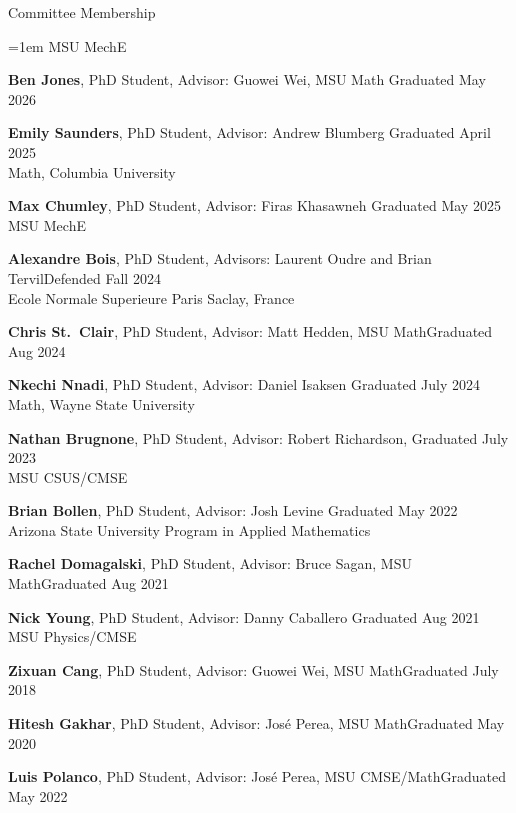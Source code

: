 \documentclass{resume} %
\begin{document}
\begin{rSection}{Committee Membership}
\begin{list}{}{\leftmargin=1em}
   \phantom{xxx}MSU MechE
   \item \textbf{Ben Jones}, PhD Student, Advisor: Guowei Wei, MSU Math \hfill Graduated May 2026
   \item \textbf{Emily Saunders}, PhD Student, Advisor: Andrew Blumberg \hfill Graduated April 2025\\
   \phantom{xxx}Math, Columbia University   
   \item \textbf{Max Chumley}, PhD Student, Advisor: Firas Khasawneh \hfill  Graduated May 2025\\
   \phantom{xxx}MSU MechE
   \item \textbf{Alexandre Bois}, PhD Student, Advisors: Laurent Oudre and Brian Tervil\hfill{Defended Fall 2024}\\
   \phantom{xxx}Ecole Normale Superieure Paris Saclay, France
   \item \textbf{Chris St.~Clair}, PhD Student, Advisor: Matt Hedden, MSU Math\hfill Graduated Aug 2024
   \item \textbf{Nkechi Nnadi}, PhD Student, Advisor: Daniel Isaksen \hfill Graduated July 2024\\
   \phantom{xxx}Math, Wayne State University 
   \item \textbf{Nathan Brugnone}, PhD Student, Advisor: Robert Richardson, \hfill  Graduated July 2023\\
   \phantom{xxx}MSU CSUS/CMSE 
    \item \textbf{Brian Bollen}, PhD Student, Advisor: Josh Levine \hfill Graduated May 2022\\
    \phantom{xxx}Arizona State University Program in Applied Mathematics
   \item \textbf{Rachel Domagalski}, PhD Student, Advisor: Bruce Sagan, MSU Math\hfill Graduated Aug 2021
   \item \textbf{Nick Young}, PhD Student, Advisor: Danny Caballero \hfill Graduated Aug 2021\\
   \phantom{xxx}MSU Physics/CMSE

   \item \textbf{Zixuan Cang}, PhD Student, Advisor: Guowei Wei, MSU Math\hfill Graduated July 2018

   \item \textbf{Hitesh Gakhar}, PhD Student, Advisor: Jos\'e Perea, MSU Math\hfill Graduated May 2020

   \item \textbf{Luis Polanco}, PhD Student, Advisor: Jos\'e Perea, MSU CMSE/Math\hfill Graduated May 2022


\end{list}
\end{rSection}
\end{document}
